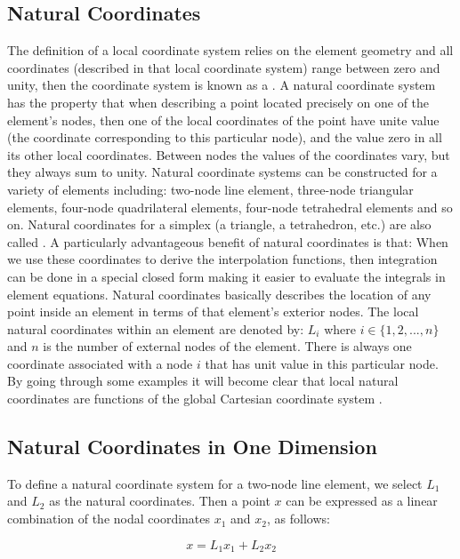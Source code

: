 \subsection{Natural Coordinates}
The definition of a local coordinate system relies on the element
geometry and all coordinates (described in that
local coordinate system) range between zero and unity, then the
coordinate system is known as a .
A natural coordinate system has the property that when describing a
point located precisely on one of the element's nodes, then one of the
local coordinates of the point have unite value (the coordinate
corresponding to this particular node), and the value zero in all
its other local coordinates.
Between nodes the values of the coordinates vary, but they
always sum to unity. Natural coordinate
systems can be constructed for a variety of elements including:
two-node line element, three-node triangular elements,
four-node quadrilateral elements, four-node tetrahedral
elements and so on.
%
Natural coordinates for a simplex (a triangle, a tetrahedron, etc.) are
also called .
%
A particularly advantageous benefit of natural coordinates is that:
When we use these coordinates to derive the interpolation functions,
then integration can be done in a special closed form making it easier
to evaluate the integrals in element equations.
%
Natural coordinates basically describes the location of any point
inside an element in terms of that element's exterior nodes. The
local natural coordinates within an element are denoted by: $L_i$
where $i \in \{1, 2, ..., n\}$ and $n$ is the number of external nodes
of the element. There is always one coordinate associated with a node
$i$ that has unit value in this particular node.
%
By going through some examples it will become clear that local natural
coordinates are functions of the global Cartesian coordinate system
.

\subsection{Natural Coordinates in One Dimension}
To define a natural coordinate system for a two-node line
element, we select $L_1$ and $L_2$ as the natural
coordinates. Then a point $x$ can be expressed as a linear
combination of the nodal coordinates $x_1$ and $x_2$, as follows:

\begin{equation}
\label{eq:1d-linear-combination}
x = L_1 x_1 + L_2 x_2
\end{equation}

